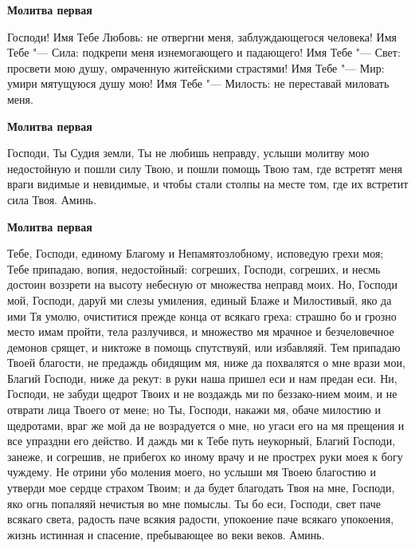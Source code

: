  


\medskip\bfseries Молитва первая\normalfont{}\nopagebreak


Господи! Имя Тебе Любовь: не отвергни меня, заблуждающегося человека! Имя Тебе "--- Сила: подкрепи меня изнемогающего и падающего! Имя Тебе "--- Свет: просвети мою душу, омраченную житейскими страстями! Имя Тебе "--- Мир: умири мятущуюся душу мою! Имя Тебе "--- Милость: не переставай миловать меня.


\medskip\bfseries Молитва первая\normalfont{}\nopagebreak


Господи, Ты Судия земли, Ты не любишь неправду, услыши молитву мою недостойную и пошли силу Твою, и пошли помощь Твою там, где встретят меня враги видимые и невидимые, и чтобы стали столпы на месте том, где их встретит сила Твоя. Аминь.


\medskip\bfseries Молитва первая\normalfont{}\nopagebreak


Тебе, Господи, единому Благому и Непамятозлобному, исповедую грехи моя; Тебе припадаю, вопия, недостойный: согреших, Господи, согреших, и несмь достоин воззрети на высоту небесную от множества неправд моих. Но, Господи мой, Господи, даруй ми слезы умиления, единый Блаже и Милостивый, яко да ими Тя умолю, очиститися прежде конца от всякаго греха: страшно бо и грозно место имам пройти, тела разлучився, и множество мя мрачное и безчеловечное демонов срящет, и никтоже в помощь спутствуяй, или избавляяй. Тем припадаю Твоей благости, не предаждь обидящим мя, ниже да похвалятся о мне врази мои, Благий Господи, ниже да рекут: в руки наша пришел еси и нам предан еси. Ни, Господи, не забуди щедрот Твоих и не воздаждь ми по беззако-нием моим, и не отврати лица Твоего от мене; но Ты, Господи, накажи мя, обаче милостию и щедротами, враг же мой да не возрадуется о мне, но угаси его на мя прещения и все упраздни его действо. И даждь ми к Тебе путь неукорный, Благий Господи, занеже, и согрешив, не прибегох ко иному врачу и не прострех руки моея к богу чуждему. Не отрини убо моления моего, но услыши мя Твоею благостию и утверди мое сердце страхом Твоим; и да будет благодать Твоя на мне, Господи, яко огнь попаляяй нечистыя во мне помыслы. Ты бо еси, Господи, свет паче всякаго света, радость паче всякия радости, упокоение паче всякаго упокоения, жизнь истинная и спасение, пребывающее во веки веков. Аминь.
\longpage{}\mychapterending


